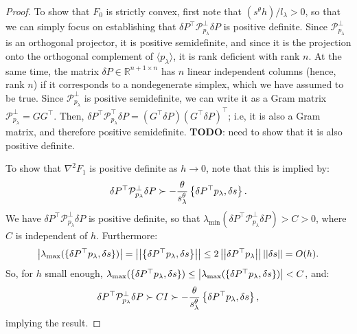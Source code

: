 \documentclass[eikonal.tex]{subfiles}
\begin{document}
\begin{proof}
  To show that $F_0$ is strictly convex, first note that
  $(s^\theta h)/l_\lambda > 0$, so that we can simply focus on
  establishing that
  $\delta P^\top \mathcal{P}^\perp_{p_\lambda} \delta P$ is positive
  definite. Since $\mathcal{P}^\perp_{p_\lambda}$ is an orthogonal
  projector, it is positive semidefinite, and since it is the
  projection onto the orthogonal complement of
  $\langle p_\lambda \rangle$, it is rank deficient with rank $n$. At
  the same time, the matrix $\delta P \in \mathbb{R}^{n + 1 \times n}$
  has $n$ linear independent columns (hence, rank $n$) if it
  corresponds to a nondegenerate simplex, which we have assumed to be
  true. Since $\mathcal{P}^\perp_{p_\lambda}$ is positive
  semidefinite, we can write it as a Gram matrix
  $\mathcal{P}^\perp_{p_\lambda} = GG^\top$. Then,
  $\delta P^\top \mathcal{P}^\top_{p_\lambda} \delta P = (G^\top
  \delta P) (G^\top \delta P)^\top$; i.e, it is also a Gram matrix,
  and therefore positive semidefinite. \textbf{TODO}: need to show
  that it is also positive definite.

  To show that $\nabla^2 F_1$ is positive definite as $h \to 0$, note
  that this is implied by:
  \begin{equation*}
    \delta P^\top \mathcal{P}^\perp_{p_\lambda} \delta P \succ -\frac{\theta}{s_\lambda^\theta} \left\{\delta P^\top p_{\lambda}, \delta s\right\}.
  \end{equation*}
  We have $\delta P^\top \mathcal{P}^\perp_{p_\lambda} \delta P$ is
  positive definite, so that
  $\lambda_{\text{min}}(\delta P^\top \mathcal{P}^\perp_{p_\lambda}
  \delta P) > C > 0$, where $C$ is independent of $h$. Furthermore:
  \begin{equation*}
    \left|\lambda_{\max} (\{\delta P^\top p_\lambda, \delta s\})\right| = \left|\left|\left\{\delta P^\top p_\lambda, \delta s\right\}\right|\right| \leq 2 \left|\left|\delta P^\top p_\lambda\right|\right| \left|\left|\delta s\right|\right| = O(h).
  \end{equation*}
  So, for $h$ small enough,
  $\lambda_{\max}(\{\delta P^\top p_\lambda, \delta s\}) \leq
  \left|\lambda_{\max}(\{\delta P^\top p_\lambda, \delta s\})\right| < C$,
  and:
  \begin{equation*}
    \delta P^\top \mathcal{P}^\perp_{p_\lambda} \delta P \succ C I \succ -\frac{\theta}{s_\lambda^\theta} \left\{\delta P^\top p_{\lambda}, \delta s\right\},
  \end{equation*}
  implying the result.
\end{proof}
\end{document}
